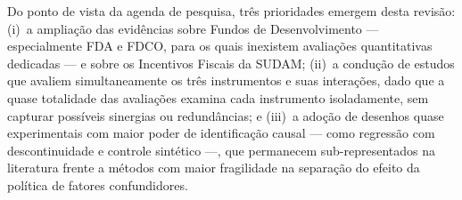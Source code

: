 Do ponto de vista da agenda de pesquisa, três prioridades emergem desta revisão: (i)~a ampliação das evidências sobre Fundos de Desenvolvimento --- especialmente FDA e FDCO, para os quais inexistem avaliações quantitativas dedicadas --- e sobre os Incentivos Fiscais da SUDAM; (ii)~a condução de estudos que avaliem simultaneamente os três instrumentos e suas interações, dado que a quase totalidade das avaliações examina cada instrumento isoladamente, sem capturar possíveis sinergias ou redundâncias; e (iii)~a adoção de desenhos quase experimentais com maior poder de identificação causal --- como regressão com descontinuidade e controle sintético ---, que permanecem sub-representados na literatura frente a métodos com maior fragilidade na separação do efeito da política de fatores confundidores.
